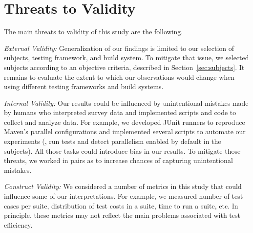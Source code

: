 \section{Threats to Validity}

The main threats to validity of this study are the following.

\textit{External Validity:} Generalization of our findings is limited
to our selection of subjects, testing framework, and build system.  To
mitigate that issue, we selected subjects according to an objective
criteria, described in Section~\ref{sec:subjects}.  It remains to
evaluate the extent to which our observations would change when using
different testing frameworks and build systems.

\textit{Internal Validity:} Our results could be influenced by
unintentional mistakes made by humans who interpreted survey data and
implemented scripts and code to collect and analyze data.
For example, we developed JUnit runners to reproduce Maven's parallel
configurations and implemented several scripts to automate our
experiments (\eg, run tests and detect parallelism enabled by default
in the subjects).
All those tasks could introduce bias in our results.
To mitigate those threats, we worked in pairs as to increase chances
of capturing unintentional mistakes.

\textit{Construct Validity:} We considered a number of metrics in this
study that could influence some of our interpretations.  For example,
we measured number of test cases per suite, distribution of test costs
in a suite, time to run a suite, etc.  In principle, these metrics may
not reflect the main problems associated with test
efficiency.

